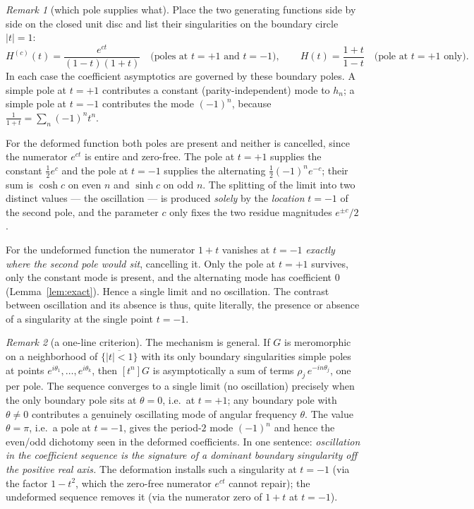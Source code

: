 \documentclass[11pt, fleqn]{amsart}
\theoremstyle{remark}
\newtheorem{remark}{Remark}
\begin{document}
\begin{remark}[which pole supplies what]\label{rem:poles}
Place the two generating functions side by side on the closed unit disc and list their
singularities on the boundary circle $|t|=1$:
\[
H^{(c)}(t)=\frac{e^{ct}}{(1-t)(1+t)}\quad\text{(poles at }t=+1\text{ and }t=-1),
\qquad
H(t)=\frac{1+t}{1-t}\quad\text{(pole at }t=+1\text{ only).}
\]
In each case the coefficient asymptotics are governed by these boundary poles. A simple
pole at $t=+1$ contributes a constant (parity-independent) mode to $h_n$; a simple pole
at $t=-1$ contributes the mode $(-1)^n$, because $\frac{1}{1+t}=\sum_n(-1)^n t^n$.

For the deformed function both poles are present and neither is cancelled, since the
numerator $e^{ct}$ is entire and zero-free. The pole at $t=+1$ supplies the constant
$\tfrac12 e^{c}$ and the pole at $t=-1$ supplies the alternating $\tfrac12(-1)^n e^{-c}$;
their sum is $\cosh c$ on even $n$ and $\sinh c$ on odd $n$. The splitting of the limit
into two distinct values --- the oscillation --- is produced \emph{solely} by the
\emph{location} $t=-1$ of the second pole, and the parameter $c$ only fixes the two
residue magnitudes $e^{\pm c}/2$.

For the undeformed function the numerator $1+t$ vanishes at $t=-1$ \emph{exactly where
the second pole would sit}, cancelling it. Only the pole at $t=+1$ survives, only the
constant mode is present, and the alternating mode has coefficient $0$
(Lemma~\ref{lem:exact}). Hence a single limit and no oscillation. The contrast between
oscillation and its absence is thus, quite literally, the presence or absence of a
singularity at the single point $t=-1$.
\end{remark}

\begin{remark}[a one-line criterion]\label{rem:criterion}
The mechanism is general. If $G$ is meromorphic on a neighborhood of $\overline{\{|t|<1\}}$
with its only boundary singularities simple poles at points $e^{i\theta_1},\dots,e^{i\theta_k}$,
then $[t^n]G$ is asymptotically a sum of terms $\rho_j\,e^{-i n\theta_j}$, one per pole.
The sequence converges to a single limit (no oscillation) precisely when the only
boundary pole sits at $\theta=0$, i.e.\ at $t=+1$; any boundary pole with $\theta\neq0$
contributes a genuinely oscillating mode of angular frequency $\theta$. The value
$\theta=\pi$, i.e.\ a pole at $t=-1$, gives the period-$2$ mode $(-1)^n$ and hence the
even/odd dichotomy seen in the deformed coefficients. In one sentence:
\emph{oscillation in the coefficient sequence is the signature of a dominant boundary
singularity off the positive real axis.} The deformation installs such a singularity at
$t=-1$ (via the factor $1-t^2$, which the zero-free numerator $e^{ct}$ cannot repair);
the undeformed sequence removes it (via the numerator zero of $1+t$ at $t=-1$).
\end{remark}
\end{document}

